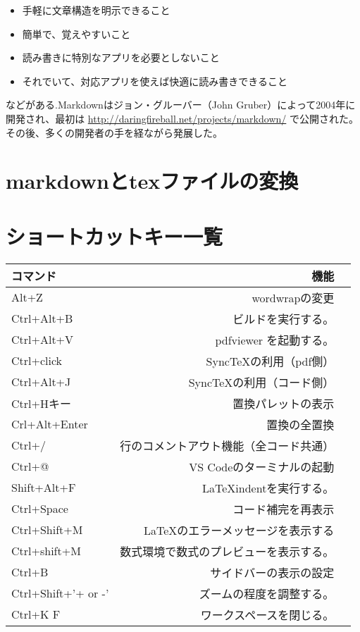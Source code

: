 \documentclass{ltjsarticle}
\begin{document}
\begin{itemize}
  \item 手軽に文章構造を明示できること
  \item 簡単で、覚えやすいこと
  \item 読み書きに特別なアプリを必要としないこと
  \item それでいて、対応アプリを使えば快適に読み書きできること
\end{itemize}

などがある.Markdownはジョン・グルーバー（John Gruber）によって2004年に開発され、最初は \url{http://daringfireball.net/projects/markdown/} で公開された。その後、多くの開発者の手を経ながら発展した。
\section{markdownとtexファイルの変換}

\appendix
\section{ショートカットキー一覧}
\begin{center}
  \begin{tabular}{lrr} \hline
    コマンド            & 機能                  \\ \hline
    Alt+Z               & wordwrapの変更        \\
    Ctrl+Alt+B          & ビルドを実行する。       \\
    Ctrl+Alt+V          & pdfviewer を起動する。    \\
    Ctrl+click          & SyncTeXの利用（pdf側）    \\
    Ctrl+Alt+J          & SyncTeXの利用（コード側）    \\
    Ctrl+Hキー          & 置換パレットの表示           \\
    Crl+Alt+Enter       & 置換の全置換              \\
    Ctrl+/              & 行のコメントアウト機能（全コード共通） \\
    Ctrl+@              & VS Codeのターミナルの起動     \\
    Shift+Alt+F         & LaTeXindentを実行する。\\
    Ctrl+Space          & コード補完を再表示\\
    Ctrl+Shift+M        & \LaTeX のエラーメッセージを表示する\\
    Ctrl+shift+M        & 数式環境で数式のプレビューを表示する。\\ 
    Ctrl+B              & サイドバーの表示の設定\\
    Ctrl+Shift+'+ or -' & ズームの程度を調整する。        \\
    Ctrl+K F            & ワークスペースを閉じる。\\ \hline
  \end{tabular}
\end{center}
\end{document}
